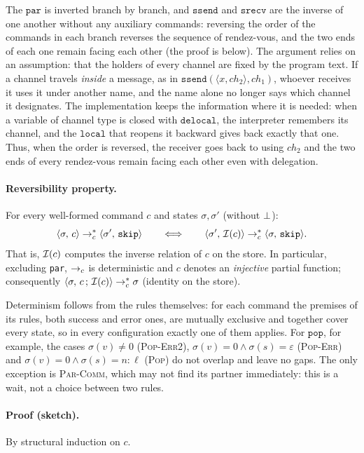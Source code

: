 \smallskip
\noindent
The $\mathtt{par}$ is inverted branch by branch, and $\mathtt{ssend}$ and
$\mathtt{srecv}$ are the inverse of one another without any auxiliary commands:
reversing the order of the commands in each branch reverses the sequence
of rendez-vous, and the two ends of each one remain facing
each other (the proof is below). The argument relies on an assumption: that the
holders of every channel are fixed by the program text. If a channel
travels \emph{inside} a message, as in $\mathtt{ssend}(\langle x,
\mathit{ch}_2\rangle, \mathit{ch}_1)$, whoever receives it uses it under another name,
and the name alone no longer says which channel it designates. The
implementation keeps the information where it is needed: when a variable of channel type is
closed with $\mathtt{delocal}$, the interpreter remembers its channel, and the
$\mathtt{local}$ that reopens it backward gives back exactly that one. Thus,
when the order is reversed, the receiver goes back to using $\mathit{ch}_2$ and the two
ends of every rendez-vous remain facing each other even with
delegation.

\paragraph{Reversibility property.}
For every well-formed command $c$ and states $\sigma, \sigma'$ (without $\err$):
\[
\cfg{c}{\sigma} \toc^{*} \cfg{\mathtt{skip}}{\sigma'}
\qquad\Longleftrightarrow\qquad
\cfg{\Inv{c}}{\sigma'} \toc^{*} \cfg{\mathtt{skip}}{\sigma} .
\]
That is, $\Inv{c}$ computes the inverse relation of $c$ on the store. In particular,
excluding \texttt{par}, $\toc$ is deterministic and $c$ denotes an \emph{injective}
partial function; consequently
$\cfg{c\,;\,\Inv{c}}{\sigma} \toc^{*} \sigma$ (identity on the store).

Determinism follows from the rules themselves: for each command the premises of its
rules, both success and error ones, are mutually exclusive and together cover every
state, so in every configuration exactly one of them applies. For
$\mathtt{pop}$, for example, the cases $\sigma(v) \neq 0$
(\textcolor{red!60!black}{\textsc{Pop-Err2}}), $\sigma(v) = 0 \land \sigma(s) =
\varepsilon$ (\textcolor{red!60!black}{\textsc{Pop-Err}}) and $\sigma(v) = 0 \land
\sigma(s) = n : \ell$ (\textsc{Pop}) do not overlap and leave no gaps.
The only exception is \textsc{Par-Comm}, which may not find its partner immediately: this is
a wait, not a choice between two rules.

\paragraph{Proof (sketch).} By structural induction on $c$.

